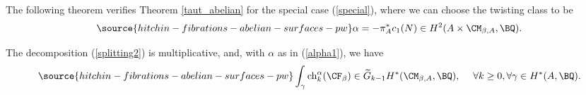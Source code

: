 The following theorem verifies Theorem \ref{taut_abelian} for the special case (\ref{special}), where we can choose the twisting class to be
\begin{equation}\label{alpha1}
\source{hitchin-fibrations-abelian-surfaces-pw}
\alpha = - \pi_A^* c_1(N) \in H^2(A\times \CM_{\beta,A}, \BQ).
\end{equation}


\begin{thm}
\notready\label{Step1}
The decomposition (\ref{splitting2}) is multiplicative, and, with
$\alpha$ as in  (\ref{alpha1}), we have
\begin{equation}\label{000}
\source{hitchin-fibrations-abelian-surfaces-pw}
\int_\gamma \mathrm{ch}^\alpha_k(\CF_\beta) \in \widetilde{G}_{k-1} H^\ast(\CM_{\beta,A}, \BQ),\quad \;
\forall k \geq 0, \forall\gamma \in H^\ast(A, \BQ).
\end{equation}
\end{thm}

